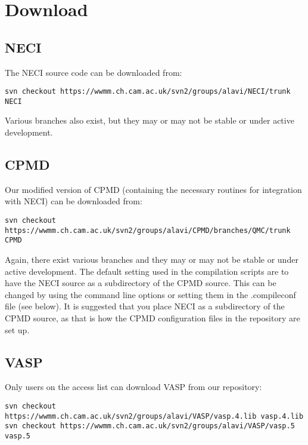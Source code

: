 \documentclass[openany,a4paper,10pt]{manual}
\begin{document}
\section{Download}


\subsection{NECI}

The NECI source code can be downloaded from:

\begin{Verbatim}[commandchars=@\[\]]
svn checkout https://wwmm.ch.cam.ac.uk/svn2/groups/alavi/NECI/trunk NECI
\end{Verbatim}

Various branches also exist, but they may or may not be stable or under
active development.


\subsection{CPMD}

Our modified version of CPMD (containing the necessary routines for
integration with NECI) can be downloaded from:

\begin{Verbatim}[commandchars=@\[\]]
svn checkout https://wwmm.ch.cam.ac.uk/svn2/groups/alavi/CPMD/branches/QMC/trunk CPMD
\end{Verbatim}

Again, there exist various branches and they may or may not be stable
or under active development.
The default setting used in the compilation scripts are to have the NECI source as
a subdirectory of the CPMD source.  This can be changed by using the
command line options or setting them in the .compileconf file (see below).
It is suggested that you place NECI as a subdirectory of the CPMD source,
as that is how the CPMD configuration files in the repository are set up.


\subsection{VASP}

Only users on the access list can download VASP from our repository:

\begin{Verbatim}[commandchars=@\[\]]
svn checkout https://wwmm.ch.cam.ac.uk/svn2/groups/alavi/VASP/vasp.4.lib vasp.4.lib
svn checkout https://wwmm.ch.cam.ac.uk/svn2/groups/alavi/VASP/vasp.5 vasp.5
\end{Verbatim}
\end{document}
